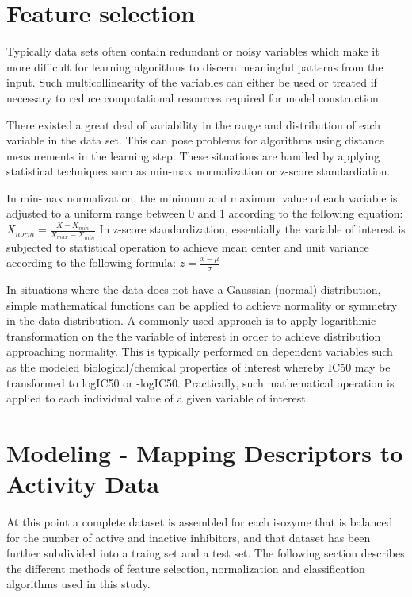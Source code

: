\section{Feature selection}

Typically data sets often contain redundant or noisy variables which make it more difficult for learning algorithms to discern meaningful patterns from the input. Such multicollinearity of the variables can either be used or treated if necessary to reduce computational resources required for model construction. \cite{Nantasenamat2009}

There existed a great deal of variability in the range and distribution of each variable in the data set. This can pose problems for algorithms using distance measurements in the learning step. These situations are handled by applying statistical techniques such as min-max normalization or z-score standardiation. 

In min-max normalization, the minimum and maximum value of each variable is adjusted to a uniform range between 0 and 1 according to the following equation: $ X_{norm} = \frac{X - X_{min}}{X_{max} - X_{min}}  $ In z-score standardization, essentially the variable of interest is subjected to statistical operation to achieve mean center and unit variance according to the following formula: $ z = \frac{x - \mu}{\sigma}  $ \cite{Nantasenamat2009}

In situations where the data does not have a Gaussian (normal) distribution, simple mathematical functions can be applied to achieve normality or symmetry in the data distribution. A commonly used approach is to apply logarithmic transformation on the the variable of interest in order to achieve distribution approaching normality. This is typically performed on dependent variables such as the modeled biological/chemical properties of interest whereby IC50 may be transformed to logIC50 or -logIC50. Practically, such mathematical operation is applied to each individual value of a given variable of interest. \cite{Nantasenamat2009}

\section{Modeling - Mapping Descriptors to Activity Data}

At this point a complete dataset is assembled for each isozyme that is balanced for the number of active and inactive inhibitors, and that dataset has been further subdivided into a traing set and a test set. The following section describes the different methods of feature selection, normalization and classification algorithms used in this study.

